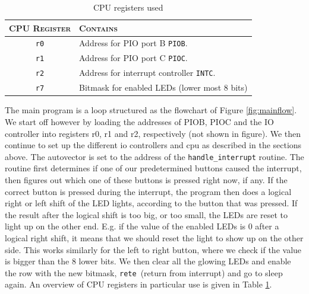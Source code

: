 \begin{table}
 \centering
 \begin{tabular}{| c | l |}
    \hline
    \textsc{CPU Register} & \textsc{Contains} \\ \hline
    \texttt{r0} &       Address for PIO port B \texttt{PIOB}. \\
    \texttt{r1} &       Address for PIO port C \texttt{PIOC}. \\
    \texttt{r2} &       Address for interrupt controller \texttt{INTC}. \\
    \texttt{r7} &	Bitmask for enabled LEDs (lower most 8 bits) \\
    \hline
 \end{tabular}
 \caption{CPU registers used}
 \label{table:cpuregs}
\end{table}

The main program is a loop structured as the flowchart of Figure \ref{fig:mainflow}. We start off however by loading the addresses of PIOB, PIOC and the IO controller into registers r0, r1 and r2, respectively (not shown in figure). We then continue to set up the different io controllers and cpu as described in the sections above. The autovector is set to the address of the \texttt{handle\_interrupt} routine. The routine first determines if one of our predetermined buttons caused the interrupt, then figures out which one of these buttons is pressed right now, if any. If the correct button is pressed during the interrupt, the program then does a logical right or left shift of the LED lights, according to the button that was pressed. If the result after the logical shift is too big, or too small, the LEDs are reset to light up on the other end. E.g. if the value of the enabled LEDs is 0 after a logical right shift, it means that we should reset the light to show up on the other side. This works similarly for the left to right button, where we check if the value is bigger than the 8 lower bits. We then clear all the glowing LEDs and enable the row with the new bitmask, \texttt{rete} (return from interrupt) and go to sleep again. An overview of CPU registers in particular use is given in Table \ref{table:cpuregs}.



